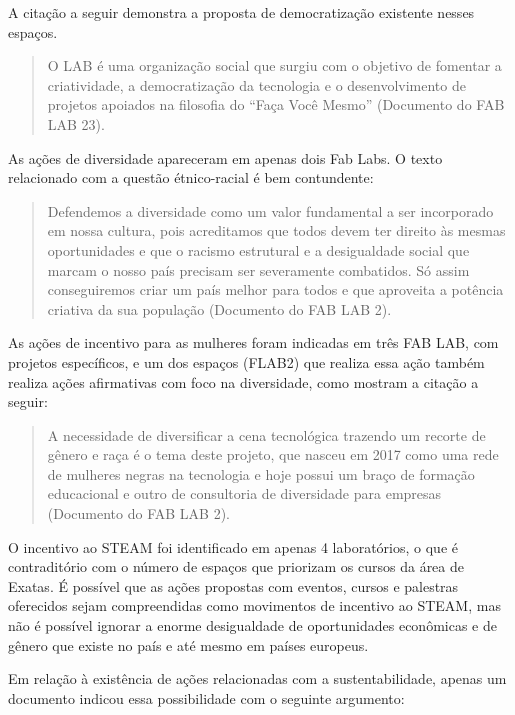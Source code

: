 \documentclass[portuguese]{textolivre}
\begin{document}
A citação a seguir demonstra a proposta de democratização existente nesses espaços.

\begin{quote}
    O LAB é uma organização social que surgiu com o objetivo de fomentar a criatividade, a democratização da tecnologia e o desenvolvimento de projetos apoiados na filosofia do ``Faça Você Mesmo'' (Documento do FAB LAB 23).
\end{quote}

As ações de diversidade apareceram em apenas dois Fab Labs. O texto relacionado com a questão étnico-racial é bem contundente:

\begin{quote}
    Defendemos a diversidade como um valor fundamental a ser incorporado em nossa cultura, pois acreditamos que todos devem ter direito às mesmas oportunidades e que o racismo estrutural e a desigualdade social que marcam o nosso país precisam ser severamente combatidos. Só assim conseguiremos criar um país melhor para todos e que aproveita a potência criativa da sua população (Documento do FAB LAB 2).
\end{quote}

As ações de incentivo para as mulheres foram indicadas em três FAB LAB, com projetos específicos, e um dos espaços (FLAB2) que realiza essa ação também realiza ações afirmativas com foco na diversidade, como mostram a citação a seguir:

\begin{quote}
    A necessidade de diversificar a cena tecnológica trazendo um recorte de gênero e raça é o tema deste projeto, que nasceu em 2017 como uma rede de mulheres negras na tecnologia e hoje possui um braço de formação educacional e outro de consultoria de diversidade para empresas (Documento do FAB LAB 2).
\end{quote}

O incentivo ao STEAM foi identificado em apenas 4 laboratórios, o que é contraditório com o número de espaços que priorizam os cursos da área de Exatas. É possível que as ações propostas com eventos, cursos e palestras oferecidos sejam compreendidas como movimentos de incentivo ao STEAM, mas não é possível ignorar a enorme desigualdade de oportunidades econômicas e de gênero que existe no país e até mesmo em países europeus.

Em relação à existência de ações relacionadas com a sustentabilidade, apenas um documento indicou essa possibilidade com o seguinte argumento:
\end{document}
